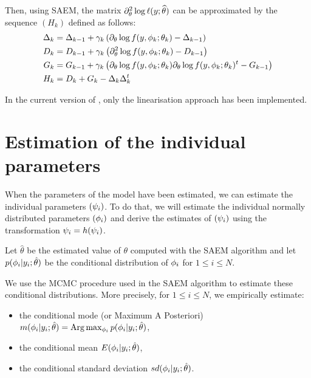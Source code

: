 Then, using SAEM, the matrix $\partial^2_\theta \log \ell (y;{\widehat{\theta}})$ can be approximated by the sequence $(H_k)$ defined as follows:
\begin{align*}
\Delta_k&=\Delta_{k-1}+\gamma_k\left(\partial_{\theta}\log
f(y,\phi_k;\theta_k)-\Delta_{k-1}\right)\\
D_k  &=   D_{k-1}   +   \gamma_k  \left( \partial^2_\theta \log  f (y,  \phi_k;
    \theta_k)   - D_{k-1} \right) \\
G_k  &=   G_{k-1}   +   \gamma_k  \left(  \partial_\theta \log f(y, \phi_k; \theta_k) \partial_\theta \log f(y, \phi_k; \theta_k)^t - G_{k-1} \right) \\
H_{k} &= D_k + G_k - \Delta_k \Delta_k^t
\end{align*}

In the current version of \monolix, only the linearisation approach has been implemented.

\section{Estimation of the individual parameters} \label{section_indivparam}

When the parameters of the model have been estimated, we can estimate the individual parameters $({\psi_i})$. To do that, we will estimate the individual normally distributed parameters $({{\phi}_i})$ and derive the estimates of $({\psi_i})$ using the transformation ${\psi_i}= h({\psi_i})$.

Let $\hat{\theta}$ be the estimated value of $\theta$ computed with the SAEM algorithm and let $p({{\phi}_i}|y_i;\hat{\theta})$ be the conditional distribution of ${{\phi}_i}$ for $1\leq i \leq N$.

We use the MCMC procedure used in the SAEM algorithm to estimate these conditional distributions. More precisely, for $1\leq i \leq N$, we empirically estimate:

\begin{itemize}
  \item the conditional mode (or Maximum A Posteriori)
  $ m({{\phi}_i}|y_i;\hat{\theta})={\rm Arg}\max_{{\phi}_i} p({{\phi}_i}|y_i;\hat{\theta})$,
  \item the conditional mean
  $ E({{\phi}_i}|y_i;\hat{\theta})$,
  \item the conditional standard deviation
 $ sd({{\phi}_i}|y_i;\hat{\theta})$.
 \end{itemize}


